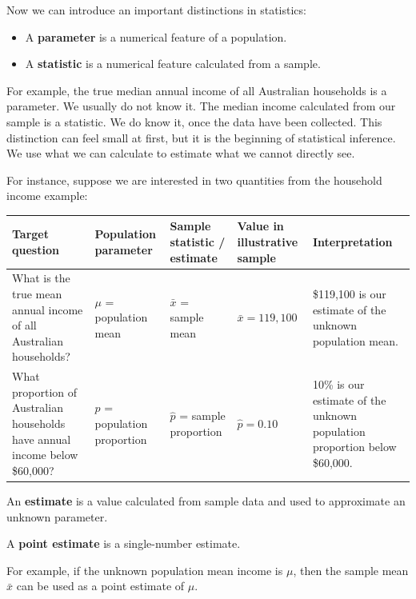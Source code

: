 \documentclass[
  letterpaper,
  DIV=11,
  numbers=noendperiod]{scrreprt}
\providecommand{\tightlist}{%
  \setlength{\itemsep}{0pt}\setlength{\parskip}{0pt}}
\begin{document}
Now we can introduce an important distinctions in statistics:

\begin{itemize}
\tightlist
\item
  A \textbf{parameter} is a numerical feature of a population.
\item
  A \textbf{statistic} is a numerical feature calculated from a sample.
\end{itemize}

For example, the true median annual income of all Australian households
is a parameter. We usually do not know it. The median income calculated
from our sample is a statistic. We do know it, once the data have been
collected. This distinction can feel small at first, but it is the
beginning of statistical inference. We use what we can calculate to
estimate what we cannot directly see.

For instance, suppose we are interested in two quantities from the
household income example:

\begin{table}
\fontsize{12.0pt}{14.0pt}\selectfont
\begin{tabular*}{\linewidth}{@{\extracolsep{\fill}}lllll}
\toprule
Target question & Population parameter & Sample statistic / estimate & Value in illustrative sample & Interpretation \\ 
\midrule\addlinespace[2.5pt]
What is the true mean annual income of all Australian households? & \(\mu\) = population mean & \(\bar{x}\) = sample mean & \(\bar{x} = 119{,}100\) & \$119,100 is our estimate of the unknown population mean. \\ 
What proportion of Australian households have annual income below \$60,000? & \(p\) = population proportion & \(\hat{p}\) = sample proportion & \(\hat{p} = 0.10\) & 10\% is our estimate of the unknown population proportion below \$60,000. \\ 
\bottomrule
\end{tabular*}
\end{table}

\begin{tcolorbox}[enhanced jigsaw, arc=.35mm, bottomrule=.15mm, bottomtitle=1mm, breakable, colback=white, colbacktitle=quarto-callout-note-color!10!white, colframe=quarto-callout-note-color-frame, coltitle=black, left=2mm, leftrule=.75mm, opacityback=0, opacitybacktitle=0.6, rightrule=.15mm, title=\textcolor{quarto-callout-note-color}{\faInfo}\hspace{0.5em}{Terminology: estimate and point estimate}, titlerule=0mm, toprule=.15mm, toptitle=1mm]

An \textbf{estimate} is a value calculated from sample data and used to
approximate an unknown parameter.

A \textbf{point estimate} is a single-number estimate.

For example, if the unknown population mean income is \(\mu\), then the
sample mean \(\bar{x}\) can be used as a point estimate of \(\mu\).

\end{tcolorbox}
\end{document}
